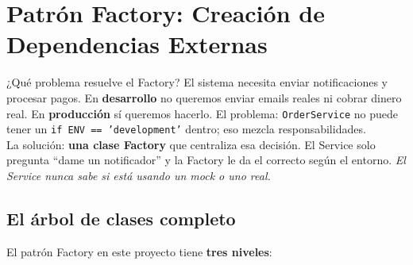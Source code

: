 \documentclass[12pt, a4paper]{article}
\begin{document}
\section{Patrón Factory: Creación de Dependencias Externas}

\begin{conceptbox}{¿Qué problema resuelve el Factory?}
El sistema necesita enviar notificaciones y procesar pagos. En \textbf{desarrollo}
no queremos enviar emails reales ni cobrar dinero real. En \textbf{producción}
sí queremos hacerlo. El problema: \texttt{OrderService} no puede tener un
\texttt{if ENV == 'development'} dentro; eso mezcla responsabilidades.\\[4pt]
La solución: \textbf{una clase Factory} que centraliza esa decisión. El Service
solo pregunta ``dame un notificador'' y la Factory le da el correcto según el entorno.
\textit{El Service nunca sabe si está usando un mock o uno real.}
\end{conceptbox}

\subsection{El árbol de clases completo}

El patrón Factory en este proyecto tiene \textbf{tres niveles}:
\end{document}
